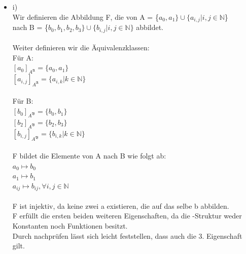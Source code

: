 \documentclass[a4paper]{scrartcl}
\begin{document}
\begin{itemize}
\newpage

        \begin{itemize}
            \item i)\\
                Wir definieren die Abbildung F, die von A = \{$a_0,a_1\} \cup \{a_{i,j} | i,j \in \mathds{N}$\}\\
                nach B = \{$b_0, b_1, b_2, b_3\} \cup \{b_{i,j} | i,j \in \mathds{N}\}$ abbildet.\\
                \\Weiter definieren wir die Äquivalenzklassen:\\
                Für A:\\
                $[a_0]_{A^\mathfrak{A}} = \{a_0,a_1\}$\\
                $[a_{i,j}]_{A^\mathfrak{A}} = \{a_{i,k} | k \in \mathds{N}\}$\\
                \\Für B:\\
                $[b_0]_{A^\mathfrak{B}} = \{b_0,b_1\}$\\
                $[b_2]_{A^\mathfrak{B}} = \{b_2,b_3\}$\\
                $[b_{i,j}]_{A^\mathfrak{B}} = \{b_{i,k} | k \in \mathds{N}\}$\\
                \\F bildet die Elemente von A nach B wie folgt ab:\\
                $a_0 \mapsto b_0$\\
                $a_1 \mapsto b_1$\\
                $a_{ij} \mapsto b_{ij}, \forall i,j \in \mathds{N}$\\
                \\F ist injektiv, da keine zwei a existieren, die auf das selbe b abbilden.\\
                F erfüllt die ersten beiden weiteren Eigenschaften, da die -Struktur weder Konstanten noch Funktionen besitzt.\\
                Durch nachprüfen lässt sich leicht feststellen, dass auch die 3. Eigenschaft gilt.\\


\end{itemize}
\end{itemize}
\end{document}
